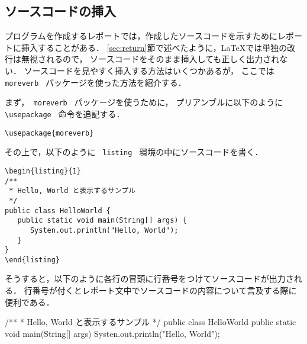 \subsection{ソースコードの挿入}

プログラムを作成するレポートでは，作成したソースコードを示すためにレポートに挿入することがある．
\ref{sec:return}節で述べたように，\LaTeX では単独の改行は無視されるので，
ソースコードをそのまま挿入しても正しく出力されない．
ソースコードを見やすく挿入する方法はいくつかあるが，
ここでは \verb+ moreverb + パッケージを使った方法を紹介する．

まず，\verb+ moreverb + パッケージを使うために，
プリアンブルに以下のように \verb+ \usepackage + 命令を追記する．
\begin{screen}
\begin{verbatim}
\usepackage{moreverb}
\end{verbatim}
\end{screen}
その上で，以下のように \verb+ listing + 環境の中にソースコードを書く．
\begin{screen}
   \begin{verbatim}
\begin{listing}{1}
/**
 * Hello, World と表示するサンプル
 */
public class HelloWorld {
   public static void main(String[] args) {
      Systen.out.println("Hello, World");
   }
}
\end{listing}
\end{verbatim}
\end{screen}
そうすると，以下のように各行の冒頭に行番号をつけてソースコードが出力される．
行番号が付くとレポート文中でソースコードの内容について言及する際に便利である．
\begin{screen}
\begin{listing}{1}
/**
 * Hello, World と表示するサンプル
 */
public class HelloWorld {
   public static void main(String[] args) {
      Systen.out.println("Hello, World");
   }
}
\end{listing}
\end{screen}

